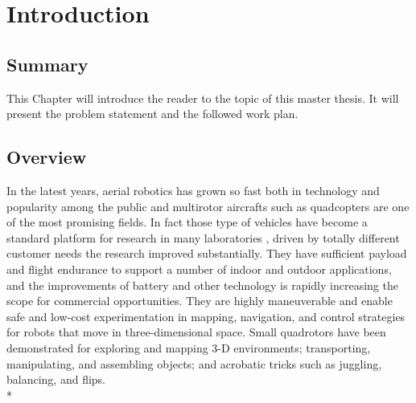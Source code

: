 

\chapter{Introduction}
\label{chap:introduction}
\ifpdf
    \graphicspath{{Introduction/Figures/PNG/}{Introduction/Figures/PDF/}{Introduction/Figures/}}
\else
    \graphicspath{{Introduction/Figures/EPS/}{Introduction/Figures/}}
\fi

\section*{Summary}

This Chapter will introduce  the reader to the topic of this master thesis. It will present the problem statement and the followed work plan.

\section{Overview}

In the latest years, aerial robotics has grown so fast both in technology and popularity among the public and multirotor aircrafts such as quadcopters are one of the most promising fields. In fact those type of vehicles have become a standard platform for research in many laboratories , driven by totally different customer needs the research improved substantially. They have sufficient payload and flight endurance to support a number of indoor and outdoor applications, and the improvements of battery and other technology is rapidly increasing the scope for commercial opportunities. They are highly maneuverable and enable safe and low-cost experimentation in mapping, navigation, and control strategies for robots that move in three-dimensional space. Small quadrotors have been demonstrated for exploring and mapping 3-D environments; transporting, manipulating, and assembling objects; and acrobatic tricks such as juggling, balancing, and flips. \\*

